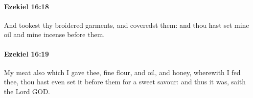 		\paragraph{Ezekiel 16:18} %
			\label{EZEKIEL-16-18}

			And tookest thy broidered garments, and coveredst them: and thou hast set mine oil and mine incense before them.


		\paragraph{Ezekiel 16:19} %
			\label{EZEKIEL-16-19}

			My meat also which I gave thee, fine flour, and oil, and honey, wherewith I fed thee, thou hast even set it before them for a sweet savour: and thus it was, saith the Lord GOD.


